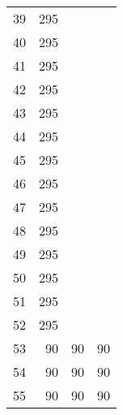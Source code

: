 \begin{table}[h!]
\begin{tabular}{lrrr}
39 & 295 &    &    \\
40 & 295 &    &    \\
41 & 295 &    &    \\
42 & 295 &    &    \\
43 & 295 &    &    \\
44 & 295 &    &    \\
45 & 295 &    &    \\
46 & 295 &    &    \\
47 & 295 &    &    \\
48 & 295 &    &    \\
49 & 295 &    &    \\
50 & 295 &    &    \\
51 & 295 &    &    \\
52 & 295 &    &    \\
53 &  90 & 90 & 90 \\
54 &  90 & 90 & 90 \\
55 &  90 & 90 & 90 \\
\bottomrule
\end{tabular}
\end{table}
